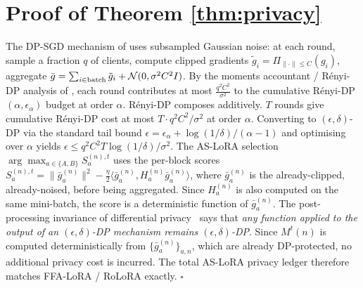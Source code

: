\section{Proof of Theorem \ref{thm:privacy}}
\label{app:proof_of_privacy}
The DP-SGD mechanism of \cite{abadi2016deep} uses subsampled Gaussian noise: at each round, sample a fraction $q$ of clients, compute clipped gradients $\tilde g_i=\Pi_{\|\cdot\|\le C}(g_i)$, aggregate $\bar g=\sum_{i\in\text{batch}}\tilde g_i+\mathcal{N}(0,\sigma^2 C^2 I)$. By the moments accountant / R\'enyi-DP analysis of \cite{mironov2017renyi,wang2019sgm}, each round contributes at most $\tfrac{q^2C^2}{\sigma^2}$ to the cumulative R\'enyi-DP $(\alpha,\epsilon_\alpha)$ budget at order $\alpha$. R\'enyi-DP composes additively. $T$ rounds give cumulative R\'enyi-DP cost at most $T\cdot q^2C^2/\sigma^2$ at order $\alpha$. Converting to $(\epsilon,\delta)$-DP via the standard tail bound $\epsilon=\epsilon_\alpha+\log(1/\delta)/(\alpha-1)$ and optimising over $\alpha$ yields $\epsilon\le q^2 C^2 T\log(1/\delta)/\sigma^2$. The AS-LoRA selection $\arg\max_{a\in\{A,B\}}S_a^{(n),t}$ uses the per-block scores $S_a^{(n),t}=\|\bar g_a^{(n)}\|^2-\tfrac{\eta}{2}\langle \bar g_a^{(n)}, H_a^{(n)}\bar g_a^{(n)}\rangle$, where $\bar g_a^{(n)}$ is the already-clipped, already-noised, before being aggregated. Since $H_a^{(n)}$ is also computed on the same mini-batch, the score is a deterministic function of $\bar g_a^{(n)}$. The post-processing invariance of differential privacy~\cite{dwork2014dpfoundations} says that \emph{any function applied to the output of an $(\epsilon,\delta)$-DP mechanism remains $(\epsilon,\delta)$-DP}. Since $M^t(n)$ is computed deterministically from $\{\bar g_a^{(n)}\}_{a,n}$, which are already DP-protected, no additional privacy cost is incurred. The total AS-LoRA privacy ledger therefore matches FFA-LoRA / RoLoRA exactly. \hfill$\square$




